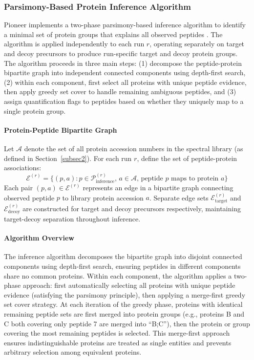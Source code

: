 \documentclass{article}
\begin{document}
\subsubsection{Parsimony-Based Protein Inference Algorithm}

Pioneer implements a two-phase parsimony-based inference algorithm to identify a minimal set of protein groups that explains all observed peptides \cite{Nesvizhskii2005,Zhang2007}. The algorithm is applied independently to each run $r$, operating separately on target and decoy precursors to produce run-specific target and decoy protein groups. The algorithm proceeds in three main steps: (1) decompose the peptide-protein bipartite graph into independent connected components using depth-first search, (2) within each component, first select all proteins with unique peptide evidence, then apply greedy set cover to handle remaining ambiguous peptides, and (3) assign quantification flags to peptides based on whether they uniquely map to a single protein group.

\paragraph{Protein-Peptide Bipartite Graph} Let $\mathcal{A}$ denote the set of all protein accession numbers in the spectral library (as defined in Section~\ref{subsec2}). For each run $r$, define the set of peptide-protein associations:
\begin{equation}
\mathcal{E}^{(r)} = \{(p, a) : p \in \mathcal{P}_{\text{inference}}^{(r)}, \, a \in \mathcal{A}, \, \text{peptide } p \text{ maps to protein } a\}
\end{equation}
Each pair $(p, a) \in \mathcal{E}^{(r)}$ represents an edge in a bipartite graph connecting observed peptide $p$ to library protein accession $a$. Separate edge sets $\mathcal{E}_{\text{target}}^{(r)}$ and $\mathcal{E}_{\text{decoy}}^{(r)}$ are constructed for target and decoy precursors respectively, maintaining target-decoy separation throughout inference.

\paragraph{Algorithm Overview} The inference algorithm decomposes the bipartite graph into disjoint connected components using depth-first search, ensuring peptides in different components share no common proteins. Within each component, the algorithm applies a two-phase approach: first automatically selecting all proteins with unique peptide evidence (satisfying the parsimony principle), then applying a merge-first greedy set cover strategy. At each iteration of the greedy phase, proteins with identical remaining peptide sets are first merged into protein groups (e.g., proteins B and C both covering only peptide 7 are merged into ``B;C''), then the protein or group covering the most remaining peptides is selected. This merge-first approach ensures indistinguishable proteins are treated as single entities and prevents arbitrary selection among equivalent proteins.
\end{document}
